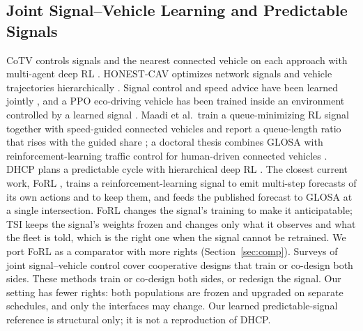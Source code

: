 \subsection{Joint Signal--Vehicle Learning and Predictable Signals}
CoTV controls signals and the nearest connected vehicle on each approach with multi-agent deep RL \cite{guo2023}. HONEST-CAV optimizes
network signals and vehicle trajectories hierarchically \cite{zhang2026}. Signal control and speed advice have been learned jointly
\cite{busch2023}, and a PPO eco-driving vehicle has been trained inside an environment controlled by a learned signal \cite{jiang2022}.
Maadi et al.\ train a queue-minimizing RL signal together with speed-guided connected vehicles and report a queue-length ratio that rises
with the guided share \cite{maadi2022}; a doctoral thesis combines GLOSA with reinforcement-learning traffic control for human-driven
connected vehicles \cite{paine2025}. DHCP plans a predictable cycle with hierarchical deep RL
\cite{gu2025}. The closest current work, FoRL \cite{gerner2026forl}, trains a reinforcement-learning signal to emit multi-step forecasts
of its own actions and to keep them, and feeds the published forecast to GLOSA at a single intersection. FoRL changes the signal's
training to make it anticipatable; TSI keeps the signal's weights frozen and changes only what it observes and what the fleet is told,
which is the right one when the signal cannot be retrained. We port FoRL as a comparator with more rights (Section~\ref{sec:comp}). Surveys of joint signal--vehicle control
\cite{guo2019survey,li2023survey,zhang2024survey} cover cooperative designs that train or co-design both sides. These methods train or co-design both sides, or redesign the signal. Our setting has fewer rights: both populations are
frozen and upgraded on separate schedules, and only the interfaces may change. Our learned predictable-signal reference is structural
only; it is not a reproduction of DHCP.

